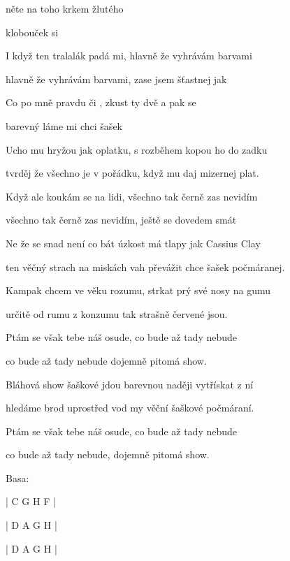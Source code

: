 

\zs
    něte na toho   krkem žlutého 					

     klobouček   si   		
\ks

\zs
    I když ten tralalák padá mi, hlavně že vyhrávám barvami

    hlavně že vyhrávám barvami, zase jsem šťastnej jak 
\ks

\zr
    Co po mně  pravdu či , zkust ty dvě  a pak se 

    barevný  láme mi   chci  šašek 
\kr

\zs
    Ucho mu hryžou jak oplatku, s rozběhem kopou ho do zadku

    tvrděj že všechno je v pořádku, když mu daj mizernej plat.
\ks

\zs
    Když ale koukám se na lidi, všechno tak černě zas nevidím

    všechno tak černě zas nevidím, ještě se dovedem smát
\ks

\zr
    Ne že se snad není co bát úzkost má tlapy jak Cassius Clay

    ten věčný strach na miskách vah převážit chce šašek počmáranej.
\kr

\zs
    Kampak chcem ve věku rozumu, strkat prý své nosy na gumu

    určitě od rumu z konzumu tak strašně červené jsou.
\ks

\zs
    Ptám se však tebe náš osude, co bude až tady nebude

    co bude až tady nebude dojemně pitomá show.
\ks

\zr
    Bláhová show šaškové jdou barevnou naději vytřískat z ní

    hledáme brod uprostřed vod my věční šaškové počmáraní.
\kr

\zs
    Ptám se však tebe náš osude, co bude až tady nebude

    co bude až tady nebude, dojemně pitomá show.
\ks


Basa:

| C G H F |

| D A G H |

| D A G H |

